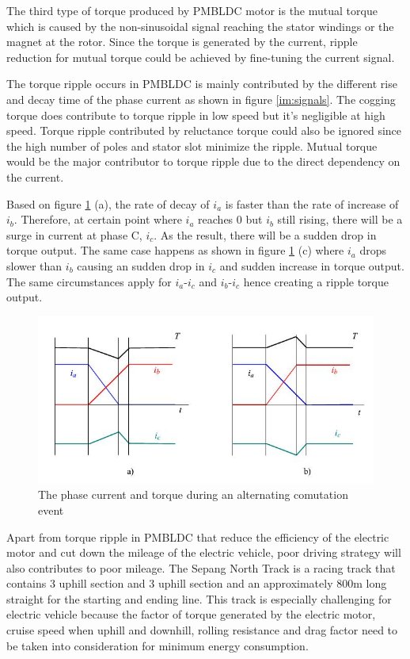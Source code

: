The third type of torque produced by PMBLDC motor is the mutual torque which is caused by the non-sinusoidal signal reaching the stator windings or the magnet at the rotor. Since the torque is generated by the current, ripple reduction for mutual torque could be achieved by fine-tuning the current signal.

The torque ripple occurs in PMBLDC is mainly contributed by the different rise and decay time of the phase current as shown in figure \ref{im:signals}. The cogging torque does contribute to torque ripple in low speed but it's negligible at high speed. Torque ripple contributed by reluctance torque could also be ignored since the high number of poles and stator slot minimize the ripple. Mutual torque would be the major contributor to torque ripple due to the direct dependency on the current.

Based on figure \ref{im:comutation} (a), the rate of decay of $i_a$ is faster than the rate of increase of $i_b$. Therefore, at certain point where $i_a$ reaches 0 but $i_b$ still rising, there will be a surge in current at phase C, $i_c$. As the result, there will be a sudden drop in torque output. The same case happens as shown in figure \ref{im:comutation} (c) where $i_a$ drops slower than $i_b$ causing an sudden drop in $i_c$ and sudden increase in torque output. The same circumstances apply for $i_a$-$i_c$ and $i_b$-$i_c$ hence creating a ripple torque output. 

\begin{figure}[htb]
	\centering
	\includegraphics[width=5.5in]{images/phase_current.jpg}
	\caption{The phase current and torque during an alternating comutation event  \citep{7648}}
	\label{im:comutation}
\end{figure}

Apart from torque ripple in PMBLDC that reduce the efficiency of the electric motor and cut down the mileage of the electric vehicle, poor driving strategy will also contributes to poor mileage. The Sepang North Track is a racing track that contains 3 uphill section and 3 uphill section and an approximately 800m long straight for the starting and ending line. This track is especially challenging for electric vehicle because the factor of torque generated by the electric motor, cruise speed when uphill and downhill, rolling resistance and drag factor need to be taken into consideration for minimum energy consumption.

